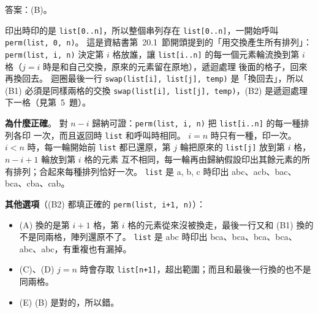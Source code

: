 \begin{pastsoln}
答案：(B)。

印出時印的是 \texttt{list[0..n]}，所以整個串列存在 \texttt{list[0..n]}，一開始呼叫 \texttt{perm(list, 0, n)}。
這是資結書第~20.1~節開頭提到的「用交換產生所有排列」：\texttt{perm(list, i, n)} 決定第 $i$ 格放誰，讓
\texttt{list[i..n]} 的每一個元素輪流換到第 $i$ 格（$j = i$ 時是和自己交換，原來的元素留在原地），遞迴處理
後面的格子，回來再換回去。 迴圈最後一行 \texttt{swap(list[i], list[j], temp)} 是「換回去」，所以 (B1)
必須是同樣兩格的交換 \texttt{swap(list[i], list[j], temp)}，(B2) 是遞迴處理下一格（見第~5~題）。

\textbf{為什麼正確}。 對 $n - i$ 歸納可證：\texttt{perm(list, i, n)} 把 \texttt{list[i..n]} 的每一種排列各印
一次，而且返回時 \texttt{list} 和呼叫時相同。 $i = n$ 時只有一種，印一次。 $i < n$ 時，每一輪開始前
\texttt{list} 都已還原，第 $j$ 輪把原來的 \texttt{list[j]} 放到第 $i$ 格，$n - i + 1$ 輪放到第 $i$ 格的元素
互不相同，每一輪再由歸納假設印出其餘元素的所有排列；合起來每種排列恰好一次。 \texttt{list} 是
a, b, c 時印出 abc、acb、bac、bca、cba、cab。

\textbf{其他選項}（(B2) 都填正確的 \texttt{perm(list, i+1, n)}）：
\begin{itemize}
\item (A) 換的是第 $i + 1$ 格，第 $i$ 格的元素從來沒被換走，最後一行又和 (B1) 換的不是同兩格，陣列還原不了。
\texttt{list} 是 abc 時印出 bca、bca、bca、bca、abc、abc，有重複也有漏掉。
\item (C)、(D) $j = n$ 時會存取 \texttt{list[n+1]}，超出範圍；而且和最後一行換的也不是同兩格。
\item (E) (B) 是對的，所以錯。
\end{itemize}
\end{pastsoln}

